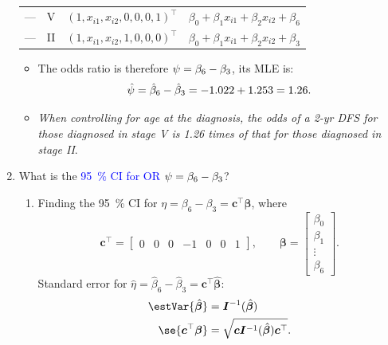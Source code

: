 \documentclass{article}\usepackage[]{graphicx}\usepackage[svgnames]{xcolor}
\let\exp\relax%
\providecommand{\Vector}[1]{\bm{#1}}%
\providecommand{\Matrix}[1]{\bm{#1}}
\begin{document}
\begin{enumerate}[label={Q\arabic*:}]
\begin{table}[!htbp]
\begin{tabular}{cccl}
                  \midrule
                  --- & V     & $ (1,x_{i1},x_{i2},0,0,0,1)^\top $ & $ \beta_0+\beta_1x_{i1}+\beta_2x_{i2}+\beta_6 $ \\
                  --- & II    & $ (1,x_{i1},x_{i2},1,0,0,0)^\top $ & $ \beta_0+\beta_1x_{i1}+\beta_2x_{i2}+\beta_3 $ \\
                  \bottomrule
              \end{tabular}
          \end{table}
          \begin{itemize}
              \item The odds ratio is therefore $ \psi=\exp{\beta_6-\beta_3} $, its MLE is:
                    \[ \hat{\psi}=\exp{\hat{\beta}_6-\hat{\beta}_3}=\exp{-1.022+1.253}=1.26. \]
              \item \emph{When controlling for age at the diagnosis, the odds of a 2-yr DFS for those
                        diagnosed in stage V is 1.26 times of that for those diagnosed in stage II}.
          \end{itemize}
    \item What is the \textcolor{Blue}{\qty{95}{\percent} CI for OR $ \psi=\exp{\beta_6-\beta_3} $}?
          \begin{enumerate}[1.]
              \item Finding the \qty{95}{\percent} CI for $ \eta=\beta_6-\beta_3=\Vector{c}^\top \Vector{\beta} $, where
                    \[ \Vector{c}^\top =\begin{bmatrix}
                            0 & 0 & 0 & -1 & 0 & 0 & 1
                        \end{bmatrix},\qquad \Vector{\beta}=\begin{bmatrix}
                            \beta_0 \\
                            \beta_1 \\
                            \vdots  \\
                            \beta_6
                        \end{bmatrix}. \]
                    Standard error for $ \hat{\eta}=\hat{\beta}_6-\hat{\beta}_3=\Vector{c}^\top\hat{\Vector{\beta}} $:
                    \begin{align*}
                        \estVar{\hat{\Vector{\beta}}}       & =\Matrix{I}^{-1}(\hat{\Vector{\beta}})                                  \\
                        \se{\Vector{c}^\top \Vector{\beta}} & =\sqrt{\Vector{c}\Matrix{I}^{-1}(\hat{\Vector{\beta}})\Vector{c}^\top}.

\end{align*}
\end{enumerate}
\end{enumerate}
\end{document}
